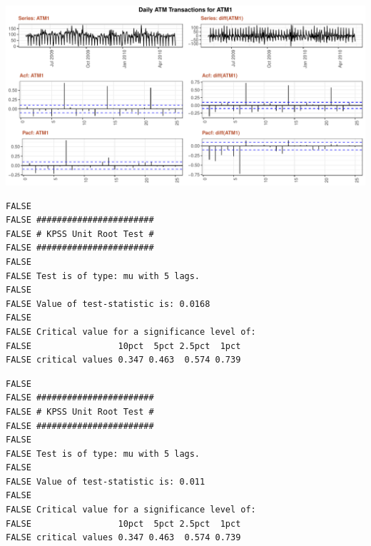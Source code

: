 \documentclass[openany]{book}
\newenvironment{Shaded}{\begin{snugshade}}{\end{snugshade}}
\newcommand{\CommentTok}[1]{\textcolor[rgb]{0.56,0.35,0.01}{\textit{#1}}}
\newcommand{\KeywordTok}[1]{\textcolor[rgb]{0.13,0.29,0.53}{\textbf{#1}}}
\newcommand{\NormalTok}[1]{#1}
\newcommand{\OperatorTok}[1]{\textcolor[rgb]{0.81,0.36,0.00}{\textbf{#1}}}
\newcommand{\StringTok}[1]{\textcolor[rgb]{0.31,0.60,0.02}{#1}}
\begin{document}
\includegraphics{project-one_files/figure-latex/unnamed-chunk-4-1.pdf}

\begin{Shaded}
\end{Shaded}

\begin{verbatim}
FALSE 
FALSE ####################### 
FALSE # KPSS Unit Root Test # 
FALSE ####################### 
FALSE 
FALSE Test is of type: mu with 5 lags. 
FALSE 
FALSE Value of test-statistic is: 0.0168 
FALSE 
FALSE Critical value for a significance level of: 
FALSE                 10pct  5pct 2.5pct  1pct
FALSE critical values 0.347 0.463  0.574 0.739
\end{verbatim}

\begin{Shaded}
\end{Shaded}

\begin{verbatim}
FALSE 
FALSE ####################### 
FALSE # KPSS Unit Root Test # 
FALSE ####################### 
FALSE 
FALSE Test is of type: mu with 5 lags. 
FALSE 
FALSE Value of test-statistic is: 0.011 
FALSE 
FALSE Critical value for a significance level of: 
FALSE                 10pct  5pct 2.5pct  1pct
FALSE critical values 0.347 0.463  0.574 0.739
\end{verbatim}
\end{document}
